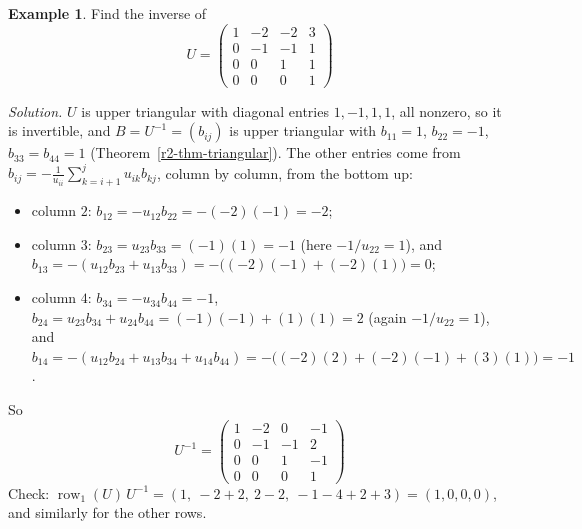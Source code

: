 \documentclass[12pt]{article}
\DeclareMathOperator{\row}{row}
\theoremstyle{definition}
\newtheorem{example}[theorem]{Example}
\begin{document}
\begin{example}\label{r2-exm-triangular}
Find the inverse of
\[
U=\begin{pmatrix}1&-2&-2&3\\0&-1&-1&1\\0&0&1&1\\0&0&0&1\end{pmatrix}
\]

\textit{Solution.} \(U\) is upper triangular with diagonal entries \(1,-1,1,1\), all nonzero, so it is invertible,
and \(B=U^{-1}=(b_{ij})\) is upper triangular with \(b_{11}=1\), \(b_{22}=-1\), \(b_{33}=b_{44}=1\)
(Theorem~\ref{r2-thm-triangular}). The other entries come from
\(b_{ij}=-\frac1{u_{ii}}\sum_{k=i+1}^ju_{ik}b_{kj}\), column by column, from the bottom up:
\begin{itemize}
\item column \(2\): \(b_{12}=-u_{12}b_{22}=-(-2)(-1)=-2\);
\item column \(3\): \(b_{23}=u_{23}b_{33}=(-1)(1)=-1\) (here \(-1/u_{22}=1\)), and
\(b_{13}=-(u_{12}b_{23}+u_{13}b_{33})=-\bigl((-2)(-1)+(-2)(1)\bigr)=0\);
\item column \(4\): \(b_{34}=-u_{34}b_{44}=-1\), \(b_{24}=u_{23}b_{34}+u_{24}b_{44}=(-1)(-1)+(1)(1)=2\) (again
\(-1/u_{22}=1\)), and
\(b_{14}=-(u_{12}b_{24}+u_{13}b_{34}+u_{14}b_{44})=-\bigl((-2)(2)+(-2)(-1)+(3)(1)\bigr)=-1\).
\end{itemize}
So
\[
U^{-1}=\begin{pmatrix}1&-2&0&-1\\0&-1&-1&2\\0&0&1&-1\\0&0&0&1\end{pmatrix}
\]
Check: \(\row_1(U)\,U^{-1}=(1,\ -2+2,\ 2-2,\ -1-4+2+3)=(1,0,0,0)\), and similarly for the other rows.
\end{example}
\end{document}

